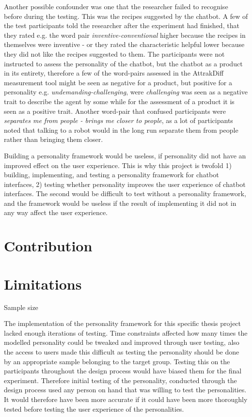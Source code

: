 Another possible confounder was one that the researcher failed to recognise before during the testing. This was the recipes suggested by the chatbot. A few of the test participants told the researcher after the experiment had finished, that they rated e.g. the word pair \textit{inventive-conventional} higher because the recipes in themselves were inventive - or they rated the characteristic helpful lower because they did not like the recipes suggested to them. The participants were not instructed to assess the personality of the chatbot, but the chatbot as a product in its entirety, therefore a few of the word-pairs assessed in the AttrakDiff measurement tool might be seen as negative for a product, but positive for a personality e.g. \textit{undemanding-challenging}, were \textit{challenging} was seen as a negative trait to describe the agent by some while for the assessment of a product it is seen as a positive trait. Another word-pair that confused participants were \textit{separates me from people - brings me closer to people}, as a lot of participants noted that talking to a robot would in the long run separate them from people rather than bringing them closer.

Building a personality framework would be useless, if personality did not have an improved effect on the user experience. This is why this project is twofold 1) building, implementing, and testing a personality framework for chatbot interfaces, 2) testing whether personality improves the user experience of chatbot interfaces. The second would be difficult to test without a personality framework, and the framework would be useless if the result of implementing it did not in any way affect the user experience.

\section{Contribution}

\section{Limitations}
Sample size

The implementation of the personality framework for this specific thesis project lacked enough iterations of testing. Time constraints affected how many times the modelled personality could be tweaked and improved through user testing, also the access to users made this difficult as testing the personality should be done by an appropriate sample belonging to the target group. Testing this on the participants throughout the design process would have biased them for the final experiment. Therefore initial testing of the personality, conducted through the design process used any person on hand that was willing to test the personalities. It would therefore have been more accurate if it could have been more thoroughly tested before testing the user experience of the personalities.


